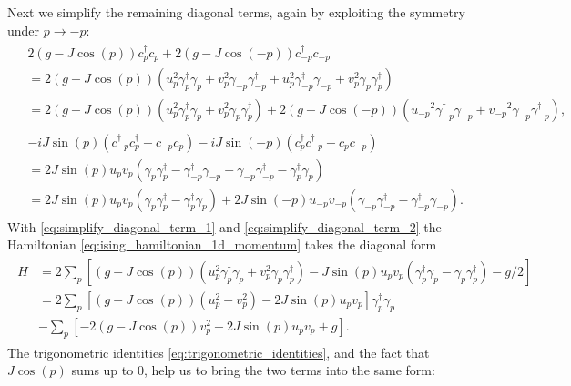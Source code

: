 \noindent Next we simplify the remaining diagonal terms, again by exploiting the symmetry under $p \rightarrow -p$:
\begin{align}\label{eq:simplify_diagonal_term_1}
\begin{split}
	&2(g - J\cos(p))c_p^{\dagger}c_p + 2(g - J\cos(-p))c_{-p}^{\dagger}c_{-p}\\
	&= 2(g - J\cos(p))(u_p^2 \gamma_p^{\dagger} \gamma_p + v_p^2 \gamma_{-p}\gamma_{-p}^{\dagger} + u_p^2 \gamma_{-p}^{\dagger} \gamma_{-p} + v_p^2 \gamma_{p}\gamma_{p}^{\dagger}) \\
	&= 2(g - J\cos(p))(u_p^2 \gamma_p^{\dagger} \gamma_p + v_p^2 \gamma_p\gamma_p^{\dagger}) + 2(g - J\cos(-p))({u_{-p}}^2\gamma_{-p}^{\dagger}\gamma_{-p} + {v_{-p}}^2\gamma_{-p}\gamma_{-p}^{\dagger}),
\end{split}
\end{align}
\begin{align}\label{eq:simplify_diagonal_term_2}
\begin{split}
&-iJ\sin(p)(c_{-p}^{\dagger}c_p^{\dagger} +c_{-p}c_p) -i J\sin(-p)(c_{p}^{\dagger}c_{-p}^{\dagger} + c_{p}c_{-p}) \\
&= 2 J\sin(p)  u_p v_p (\gamma_p \gamma_p^{\dagger} - \gamma_{-p}^{\dagger} \gamma_{-p} +  \gamma_{-p}\gamma_{-p}^{\dagger} - \gamma_p^{\dagger}\gamma_p) \\
&= 2 J\sin(p)  u_p v_p (\gamma_p \gamma_p^{\dagger} - \gamma_p^{\dagger}\gamma_p) + 2J\sin(-p)  u_{-p} v_{-p} ( \gamma_{-p}\gamma_{-p}^{\dagger} - \gamma_{-p}^{\dagger} \gamma_{-p}).
\end{split}
\end{align}
\noindent With \eqref{eq:simplify_diagonal_term_1} and \eqref{eq:simplify_diagonal_term_2} the Hamiltonian \eqref{eq:ising_hamiltonian_1d_momentum} takes the diagonal form
\begin{align}
\begin{split}
	H &= 2 \sum_p \left[ (g - J\cos(p))(u_p^2 \gamma_p^{\dagger} \gamma_p + v_p^2 \gamma_p\gamma_p^{\dagger}) - J\sin(p)  u_p v_p (\gamma_p^{\dagger}\gamma_p-\gamma_p \gamma_p^{\dagger} ) - g/2 \right] \\
	&= 2 \sum_p \left[ (g - J\cos(p))(u_p^2  - v_p^2) - 2J\sin(p)  u_p v_p \right]\gamma_p^{\dagger} \gamma_p \\
	& - \sum_p \left[-2(g - J\cos(p))v_p^2 - 2J\sin(p)  u_p v_p + g \right].
\end{split}
\end{align}
The trigonometric identities \eqref{eq:trigonometric_identities}, and the fact that $J \cos(p)$ sums up to 0, help us to bring the two terms into the same form:
